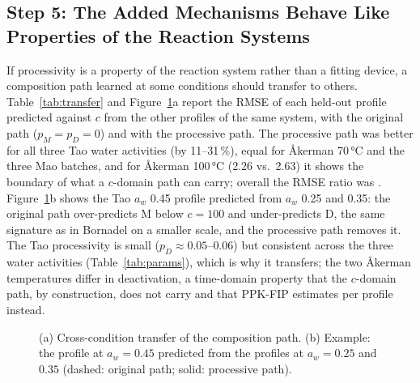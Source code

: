 \subsection{Step 5: The Added Mechanisms Behave Like Properties of the Reaction Systems}
If processivity is a property of the reaction system rather than a fitting device, a composition path learned at some conditions should transfer to others. Table~\ref{tab:transfer} and Figure~\ref{fig:transfer}a report the RMSE of each held-out profile predicted against $c$ from the other profiles of the same system, with the original path ($p_M=p_D=0$) and with the processive path. The processive path was better for all three Tao water activities (by 11--31\,\%), equal for Åkerman 70\,°C and the three Mao batches, and for Åkerman 100\,°C (2.26 vs.\ 2.63) it shows the boundary of what a $c$-domain path can carry; overall the RMSE ratio was \TransferRatio. Figure~\ref{fig:transfer}b shows the Tao $a_w$ 0.45 profile predicted from $a_w$ 0.25 and 0.35: the original path over-predicts M below $c=100$ and under-predicts D, the same signature as in Bornadel on a smaller scale, and the processive path removes it. The Tao processivity is small ($p_D\approx0.05$--$0.06$) but consistent across the three water activities (Table~\ref{tab:params}), which is why it transfers; the two Åkerman temperatures differ in deactivation, a time-domain property that the $c$-domain path, by construction, does not carry and that PPK-FIP estimates per profile instead.
\begin{figure}[!htbp]\centering{}\caption{(a) Cross-condition transfer of the composition path. (b) Example: the profile at $a_w=0.45$ predicted from the profiles at $a_w=0.25$ and $0.35$ (dashed: original path; solid: processive path).}\label{fig:transfer}\end{figure}

